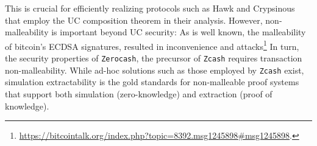\documentclass[runningheads,11pt]{llncs}
\begin{document}
  This is crucial for efficiently realizing protocols such as Hawk and
  Crypsinous that employ the UC composition theorem in their analysis. However,
  non-malleability is important beyond UC security: As is well known, the
  malleability of bitcoin's ECDSA signatures, resulted in inconvenience and
  attacks\footnote{\url{https://bitcointalk.org/index.php?topic=8392.msg1245898#msg1245898}.}
  In turn, the security properties of \texttt{Zerocash}, the precursor of
  \texttt{Zcash} requires transaction non-malleability. While ad-hoc solutions
  such as those employed by \texttt{Zcash} exist, simulation
  extractability is the gold standards for non-malleable proof systems that support both
  simulation (zero-knowledge) and extraction (proof of knowledge).

	

		
\end{document}
